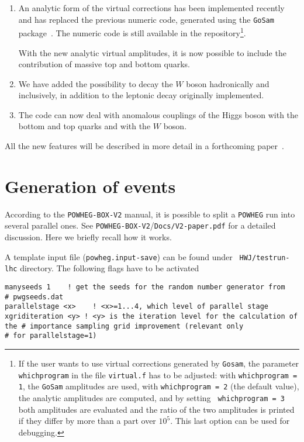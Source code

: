\documentclass[paper]{JHEP3}
\newcommand\POWHEG{{\tt POWHEG}}
\newcommand\POWHEGBOXV{{\tt POWHEG-BOX-V2}}
\begin{document}
\begin{enumerate}
\item An analytic form of the virtual corrections has been implemented
  recently and has replaced the previous numeric code, generated using the
  {\tt GoSam} package~\cite{Cullen:2011ac}. The numeric code is still
  available in the repository\footnote{If the user wants to use virtual
    corrections generated by {\tt Gosam}, the parameter {\tt whichprogram} in
    the file {\tt virtual.f} has to be adjusted: with {\tt whichprogram = 1},
    the {\tt GoSam} amplitudes are used, with {\tt whichprogram = 2} (the
    default value), the analytic amplitudes are computed, and by setting {\tt
      whichprogram = 3} both amplitudes are evaluated and the ratio of the
    two amplitudes is printed if they differ by more than a part over
    $10^5$. This last option can be used for debugging.}.

   With the new analytic virtual amplitudes, it is now possible to include
   the contribution of massive top and bottom quarks.

\item We have added the possibility to decay the $W$ boson hadronically and
  inclusively, in addition to the leptonic decay originally implemented.

\item The code can now deal with anomalous couplings of the Higgs
  boson with the bottom and top quarks and with the $W$ boson.

\end{enumerate}

All the new features will be described in more detail in a forthcoming
paper~\cite{toappear}.




\section{Generation of events}

According to the \POWHEGBOXV{} manual, it is possible to split a \POWHEG{}
run into several parallel ones.  See \POWHEGBOXV{}/{\tt Docs/V2-paper.pdf}
for a detailed discussion. Here we briefly recall how it works.

A template input file ({\tt powheg.input-save}) can be found under {\tt
  HWJ/testrun-lhc} directory. The following flags have to be activated

\noindent
{\tt manyseeds 1 \qquad \quad \,\,\,! get the
  seeds for the random number generator from 
\\ \# \qquad \qquad \qquad
  \qquad \qquad pwgseeds.dat
\\ parallelstage <x> \,\,\,! <x>=1...4, which
  level of parallel stage
\\ xgriditeration <y> ! <y> is the iteration level
  for the calculation of the \# \qquad \qquad \qquad \qquad \qquad importance
  sampling grid improvement (relevant only 
\\ \# \qquad \qquad \qquad \qquad
  \qquad for parallelstage=1)}
\end{document}
